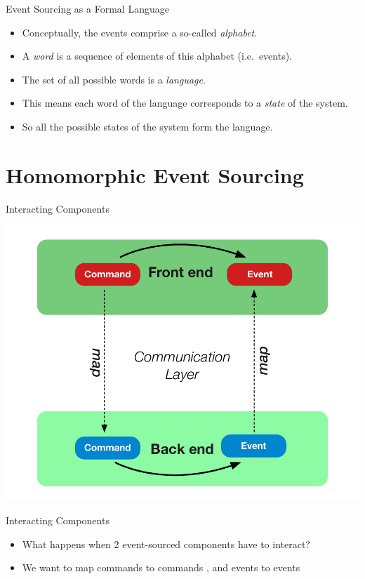 \begin{frame}[fragile]{Event Sourcing as a Formal Language}

\begin{itemize}[<+->]
\item Conceptually, the events comprise a so-called \textit{alphabet}.
\item A \textit{word} is a sequence of elements of this alphabet (i.e.~events).
\item The set of all possible words is a \textit{language}.
\item This means each word of the language corresponds to a \textit{state} of the system.
\item So all the possible states of the system form the language.
\end{itemize}

\end{frame}

\part{Homomorphic Event Sourcing}

\begin{frame}[fragile]{Interacting Components}
\begin{center}
\includegraphics[height=.8\textheight]{./images/interaction-loop.pdf}
\end{center}
\end{frame}

\begin{frame}[fragile]{Interacting Components}
  \begin{itemize}
  \item What happens when 2 event-sourced components have to interact?
  \item We want to map commands to commands , and events to events
  \end{itemize}
\end{frame}


